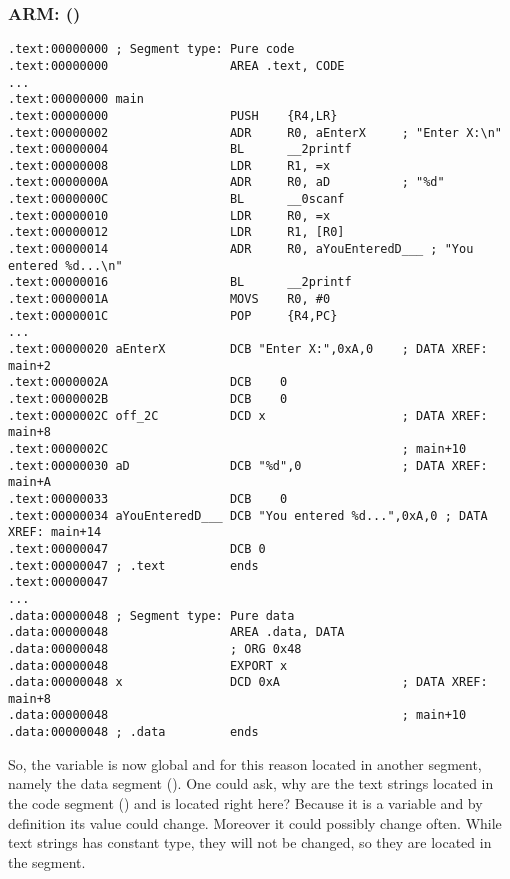 \subsubsection{ARM: \OptimizingKeilVI (\ThumbMode)}

\begin{lstlisting}
.text:00000000 ; Segment type: Pure code
.text:00000000                 AREA .text, CODE
...
.text:00000000 main
.text:00000000                 PUSH    {R4,LR}
.text:00000002                 ADR     R0, aEnterX     ; "Enter X:\n"
.text:00000004                 BL      __2printf
.text:00000008                 LDR     R1, =x
.text:0000000A                 ADR     R0, aD          ; "%d"
.text:0000000C                 BL      __0scanf
.text:00000010                 LDR     R0, =x
.text:00000012                 LDR     R1, [R0]
.text:00000014                 ADR     R0, aYouEnteredD___ ; "You entered %d...\n"
.text:00000016                 BL      __2printf
.text:0000001A                 MOVS    R0, #0
.text:0000001C                 POP     {R4,PC}
...
.text:00000020 aEnterX         DCB "Enter X:",0xA,0    ; DATA XREF: main+2
.text:0000002A                 DCB    0
.text:0000002B                 DCB    0
.text:0000002C off_2C          DCD x                   ; DATA XREF: main+8
.text:0000002C                                         ; main+10
.text:00000030 aD              DCB "%d",0              ; DATA XREF: main+A
.text:00000033                 DCB    0
.text:00000034 aYouEnteredD___ DCB "You entered %d...",0xA,0 ; DATA XREF: main+14
.text:00000047                 DCB 0
.text:00000047 ; .text         ends
.text:00000047
...
.data:00000048 ; Segment type: Pure data
.data:00000048                 AREA .data, DATA
.data:00000048                 ; ORG 0x48
.data:00000048                 EXPORT x
.data:00000048 x               DCD 0xA                 ; DATA XREF: main+8
.data:00000048                                         ; main+10
.data:00000048 ; .data         ends
\end{lstlisting}

So, the  variable is now global and for this reason located in another segment, namely the data segment ().
One could ask, why are the text strings located in the code segment () and  is located right here?
Because it is a variable and by definition its value could change. Moreover it could possibly change often.
While text strings has constant type, they will not be changed, so they are located in the  segment.
\myindex{\RAM}
\myindex{\ROM}

